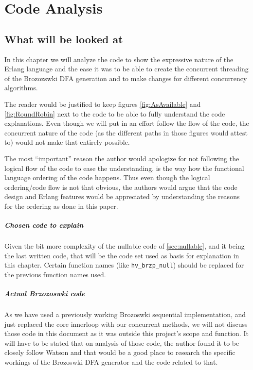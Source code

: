 \chapter{Code Analysis}

\section{What will be looked at}

In this chapter we will analyze the code to show the expressive nature
of the Erlang language and the ease it was to be able to create the
concurrent threading of the Brozozswki DFA generation and to make
changes for different concurrency algorithms.

The reader would be justified to keep figures \ref{fig:AsAvailable} and
\ref{fig:RoundRobin} next to the code to be able to fully understand the
code explanations. Even though we will put in an effort follow the flow of the
code, the concurrent nature of the code (as the different paths in
those figures would attest to) would not make that entirely
possible.

The most ``important'' reason the author would apologize for not
following the logical flow of the code to ease the understanding, is
the way how the functional language ordering of the code happens. Thus
even though the logical ordering/code flow is not that obvious, the
authors would argue that the code design and Erlang features would be
appreciated by understanding the reasons for the ordering as done in
this paper.

\paragraph{Chosen code to explain}

Given the bit more complexity of the nullable code of
\ref{sec:nullable}, and it being the last written code, that will be
the code set used as basis for explanation in this chapter. Certain
function names (like \texttt{hv\_brzp\_null}) should be replaced for
the previous function names used.

\paragraph{Actual Brzozoswki code}

As we have used a previously working Brozoswki sequential
implementation, and just replaced the core innerloop with our
concurrent methods, we will not discuss those code in this document as
it was outside this project's scope and function. It will have to be
stated that on analysis of those code, the author found it to be
closely follow Watson\cite{watson1995taxonomies} and that would be a good place
to research the specific workings of the Brozoswki DFA generator and
the code related to that.

